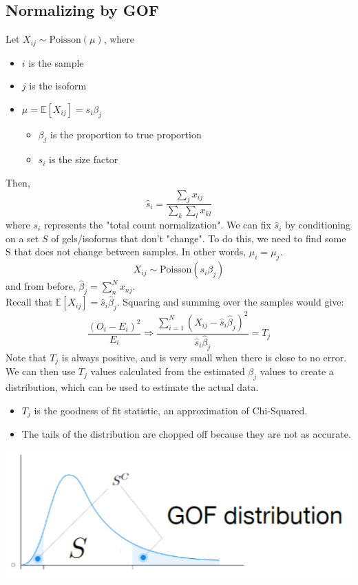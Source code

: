\documentclass[10pt]{article}
\begin{document}
\subsection*{Normalizing by GOF}
Let $X_{ij} \sim \text{Poisson}(\mu)$, where
\begin{itemize}
    \item $i$ is the sample
    \item $j$ is the isoform
    \item $\mu = \mathbb{E}[X_{ij}] = s_i \beta_j$
    \begin{itemize}
        \item $\beta_j$ is the proportion to true proportion
        \item $s_i$ is the size factor
    \end{itemize}
\end{itemize}    
Then,
\[\hat s_i = \frac{\sum_j x_{ij}}{\sum_k \sum_l x_{kl}}\]
where $s_i$ represents the "total count normalization".  We can fix $\hat s_i$ by conditioning on a set $S$ of gels/isoforms that don't "change".  To do this, we need to find some S that does not change between samples.  In other words, $\mu_i = \mu_j$.
\[X_{ij} \sim \text{Poisson}(s_i \beta_j)\]
and from before, $\hat \beta_j = \sum_n^N x_{nj}$.\\
Recall that $\mathbb{E}[X_{ij}] = \hat s_i \hat \beta_j$.  Squaring and summing over the samples would give:
\[\frac{(O_i - E_i)^2}{E_i} \Rightarrow \frac{\sum_{i = 1}^N (X_{ij} - \hat s_i \hat \beta_j)^2}{\hat s_i \hat \beta_j} = T_j\]
Note that $T_j$ is always positive, and is very small when there is close to no error.
We can then use $T_j$ values calculated from the estimated $\beta_j$ values to create a distribution, which can be used to estimate the actual data.
\begin{itemize}
    \item $T_j$ is the goodness of fit statistic, an approximation of Chi-Squared.
    \item The tails of the distribution are chopped off because they are not as accurate.
\end{itemize}
\begin{center}
    \includegraphics*[scale=1]{W3_10.png}
\end{center}
\end{document}

